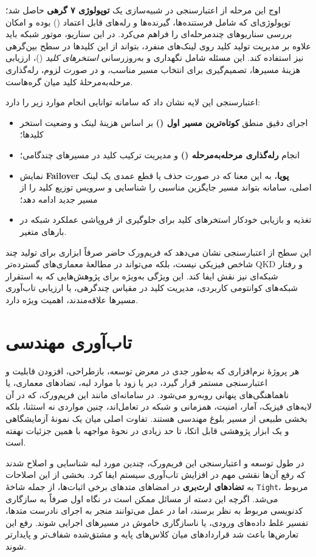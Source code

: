 \begin{sloppypar}
اوج این مرحله از اعتبارسنجی در شبیه‌سازی یک \textbf{توپولوژی ۷ گرهی} حاصل شد؛ توپولوژی‌ای که شامل فرستنده‌ها، گیرنده‌ها و رله‌های قابل اعتماد () بوده و امکان بررسی سناریوهای چندمرحله‌ای را فراهم می‌کرد. در این سناریو، موتور شبکه باید علاوه بر مدیریت تولید کلید روی لینک‌های منفرد، بتواند از این کلیدها در سطح بین‌گرهی نیز استفاده کند. این مسئله شامل نگهداری و به‌روزرسانی \textit{استخرهای کلید} ()، ارزیابی هزینهٔ مسیرها، تصمیم‌گیری برای انتخاب مسیر مناسب، و در صورت لزوم، رله‌گذاری مرحله‌به‌مرحلهٔ کلید میان گره‌هاست.

اعتبارسنجی این لایه نشان داد که سامانه توانایی انجام موارد زیر را دارد:
\begin{itemize}
	\item اجرای دقیق منطق \textbf{کوتاه‌ترین مسیر اول ()} بر اساس هزینهٔ لینک و وضعیت استخر کلیدها؛
	\item انجام \textbf{رله‌گذاری مرحله‌به‌مرحله ()} و مدیریت ترکیب کلید در مسیرهای چندگامی؛
	\item نمایش \textbf{Failover پویا}، به این معنا که در صورت حذف یا قطع عمدی یک لینک اصلی، سامانه بتواند مسیر جایگزین مناسبی را شناسایی و سرویس توزیع کلید را از مسیر جدید ادامه دهد؛
	\item تغذیه و بازیابی خودکار استخرهای کلید برای جلوگیری از فروپاشی عملکرد شبکه در بارهای متغیر.
\end{itemize}

این سطح از اعتبارسنجی نشان می‌دهد که فریم‌ورک حاضر صرفاً ابزاری برای تولید چند شاخص فیزیکی نیست، بلکه می‌تواند در مطالعهٔ معماری‌های گسترده‌تر QKD و رفتار شبکه‌ای نیز نقش ایفا کند. این ویژگی به‌ویژه برای پژوهش‌هایی که به استقرار شبکه‌های کوانتومی کاربردی، مدیریت کلید در مقیاس چندگرهی، یا ارزیابی تاب‌آوری مسیرها علاقه‌مندند، اهمیت ویژه دارد.

\section*{تاب‌آوری مهندسی}

هر پروژهٔ نرم‌افزاری که به‌طور جدی در معرض توسعه، بازطراحی، افزودن قابلیت و اعتبارسنجی مستمر قرار گیرد، دیر یا زود با موارد لبه، تضادهای معماری، یا ناهماهنگی‌های پنهانی روبه‌رو می‌شود. در سامانه‌ای مانند این فریم‌ورک، که در آن لایه‌های فیزیک، آمار، امنیت، همزمانی و شبکه در تعامل‌اند، چنین مواردی نه استثنا، بلکه بخشی طبیعی از مسیر بلوغ مهندسی هستند. تفاوت اصلی میان یک نمونهٔ آزمایشگاهی و یک ابزار پژوهشی قابل اتکا، تا حد زیادی در نحوهٔ مواجهه با همین جزئیات نهفته است.

در طول توسعه و اعتبارسنجی این فریم‌ورک، چندین مورد لبه شناسایی و اصلاح شدند که رفع آن‌ها نقشی مهم در افزایش تاب‌آوری سیستم ایفا کرد. بخشی از این اصلاحات به \textbf{تضادهای ارث‌بری} در امضاهای متدهای برخی اثبات‌ها، از جمله شاخهٔ \texttt{Tight}، مربوط می‌شد. اگرچه این دسته از مسائل ممکن است در نگاه اول صرفاً به سازگاری کدنویسی مربوط به نظر برسند، اما در عمل می‌توانند منجر به اجرای نادرست متدها، تفسیر غلط داده‌های ورودی، یا ناسازگاری خاموش در مسیرهای اجرایی شوند. رفع این تعارض‌ها باعث شد قراردادهای میان کلاس‌های پایه و مشتق‌شده شفاف‌تر و پایدارتر شوند.


\end{sloppypar}
